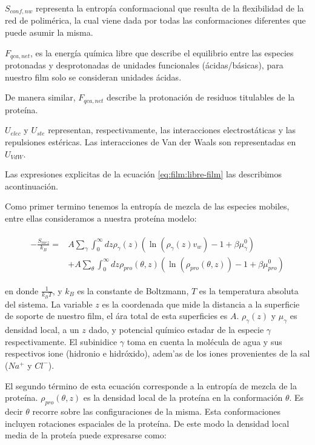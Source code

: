 $S_{conf,nw}$ representa la entrop\'ia conformacional que resulta de la flexibilidad de la red de polim\'erica, la cual viene dada por todas las conformaciones diferentes que puede asumir la misma.

$F_{qca,net}$, es la energ\'ia qu\'imica libre que describe el equilibrio entre las especies protonadas y desprotonadas de unidades funcionales (\'acidas/b\'asicas), para nuestro film solo se consideran unidades \'acidas.

De manera similar, $F_{qca,net}$ describe la protonaci\'on de residuos titulables de la prote\'ina.

$U_{elec}$ y $U_{ste}$ representan, respectivamente, las interacciones electrost\'aticas y las repulsiones est\'ericas.
Las interacciones de Van der Waals son representadas en $U_{VdW}$.


Las expresiones explicitas de la ecuaci\'on \ref{eq:film:libre-film} las describimos acontinuaci\'on.

Como primer termino tenemos la entrop\'ia de mezcla de  las especies mobiles, entre ellas consideramos a nuestra prote\'ina modelo:

\begin{align}
	\begin{aligned}
		-\frac{S_{mez}}{k_B}= &A\sum_{\gamma}\int_0^\infty{dz\rho_\gamma(z)\left(\ln \left(\rho_\gamma (z)v_w\right) -1 + \beta\mu^0_\gamma\right)} \\
		&+ A\sum_{\theta}\int_0^\infty{dz\rho_{pro}(\theta,z)\left(\ln \left(\rho_{pro}(\theta,z)\right) -1 + \beta\mu^0_{pro} \right)}
	\end{aligned}
\end{align}

\noindent en donde $\frac{1}{k_B T}$, y $k_B$ es la constante de Boltzmann, $T$ es la temperatura absoluta del sistema. La variable $z$ es la coordenada que mide la distancia a la superficie de soporte de nuestro film, el \'ara total de esta superficies es $A$. $\rho_\gamma(z)$ y $\mu_\gamma$ es densidad local, a un $z$ dado, y potencial qu\'imico estadar de la especie $\gamma$ respectivamente.
El subinidice $\gamma$ toma en cuenta la mol\'ecula de agua y sus respectivos ione (hidronio e hidr\'oxido), adem'as de los iones provenientes de la sal ($Na^+$ y $Cl^-$). 


El segundo t\'ermino de esta ecuaci\'on corresponde a la entrop\'ia de mezcla de la prote\'ina. $\rho_{pro}(\theta,z)$ es la densidad local de la prote\'ina en la conformaci\'on $\theta$. Es decir $\theta$ recorre sobre las configuraciones de la misma.
Esta conformaciones incluyen rotaciones espaciales de la prote\'ina.
De este modo la densidad local media de la prote\'ia puede expresarse como:


